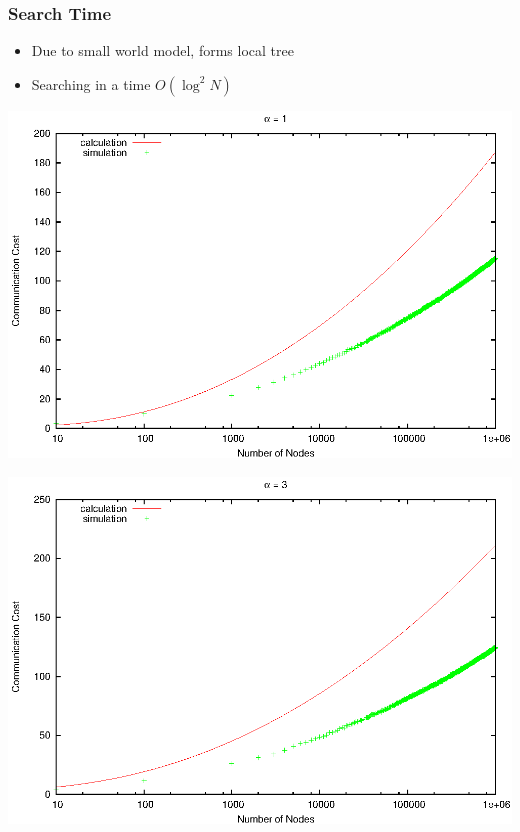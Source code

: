 \documentclass[red]{beamer}
\begin{document}
\begin{frame}
\frametitle{Search Time}
\begin{itemize}
\item Due to small world model, forms local tree 
\item Searching in a time $O(\log^2 N)$
\end{itemize}
\begin{minipage}{5cm}
\centering
\includegraphics[scale=0.4]{figs/time1}
\end{minipage}
\begin{minipage}{5cm}
\centering
\includegraphics[scale=0.4]{figs/time3}
\end{minipage}

\end{frame}

\end{document}
